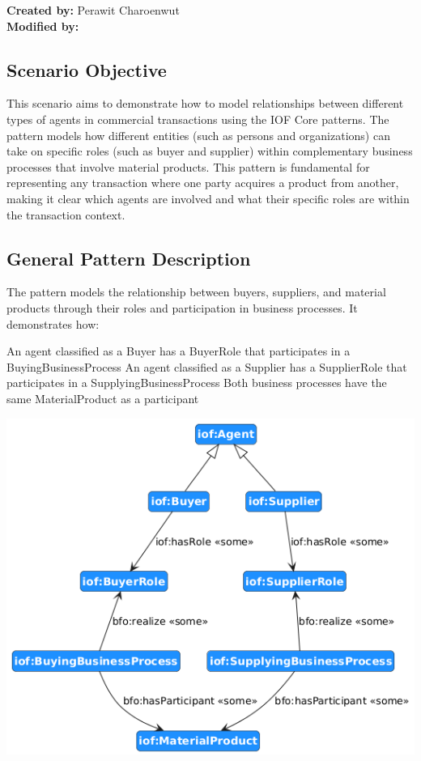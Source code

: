 \label{chapter-scenario-template}
\textbf{Created by:} Perawit Charoenwut \\
\textbf{Modified by:}

\subsection*{Scenario Objective}
This scenario aims to demonstrate how to model relationships between different types of agents in commercial transactions using the IOF Core patterns. The pattern models how different entities (such as persons and organizations) can take on specific roles (such as buyer and supplier) within complementary business processes that involve material products. This pattern is fundamental for representing any transaction where one party acquires a product from another, making it clear which agents are involved and what their specific roles are within the transaction context.

\subsection*{General Pattern Description}
The pattern models the relationship between buyers, suppliers, and material products through their roles and participation in business processes. It demonstrates how:

An agent classified as a Buyer has a BuyerRole that participates in a BuyingBusinessProcess
An agent classified as a Supplier has a SupplierRole that participates in a SupplyingBusinessProcess
Both business processes have the same MaterialProduct as a participant

\includegraphics[scale=0.4]{scenarios/different-type-agent/image/different-type-agent-schema.png}

